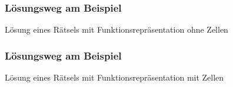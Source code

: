 \documentclass[final]{beamer}
\begin{document}
\begin{frame}
\frametitle{Lösungsweg am Beispiel}
Lösung eines Rätsels mit Funktionsrepräsentation ohne Zellen\\
\begin{figure}
\centering
{}
\end{figure}
\end{frame}

\begin{frame}
\frametitle{Lösungsweg am Beispiel}
Lösung eines Rätsels mit Funktionsrepräsentation mit Zellen\\
\begin{figure}
\centering
{}
\end{figure}
\end{frame}
\end{document}
